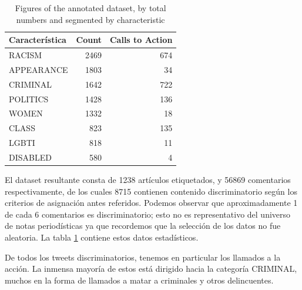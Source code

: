 \begin{table}
    \centering
    \begin{tabular}{lrr}
        \toprule
        Característica &  Count &  Calls to Action \\
        \midrule
        RACISM         &   2469 &              674 \\
        APPEARANCE     &   1803 &               34 \\
        CRIMINAL       &   1642 &              722 \\
        POLITICS       &   1428 &              136 \\
        WOMEN          &   1332 &               18 \\
        CLASS          &    823 &              135 \\
        LGBTI          &    818 &               11 \\
        DISABLED       &    580 &                4 \\
        \bottomrule
    \end{tabular}
    \caption{Figures of the annotated dataset, by total numbers and segmented by characteristic}
    \label{tab:dataset_figures}

\end{table}

El dataset resultante consta de 1238 artículos etiquetados, y 56869 comentarios respectivamente, de los cuales 8715 contienen contenido discriminatorio según los criterios de asignación antes referidos. Podemos observar que aproximadamente 1 de cada 6 comentarios es discriminatorio; esto no es representativo del universo de notas periodísticas ya que recordemos que la selección de los datos no fue aleatoria. La tabla \ref{tab:dataset_figures} contiene estos datos estadísticos.

De todos los tweets discriminatorios, tenemos en particular los llamados a la acción. La inmensa mayoría de estos está dirigido hacia la categoría CRIMINAL, muchos en la forma de llamados a matar a criminales y otros delincuentes.

